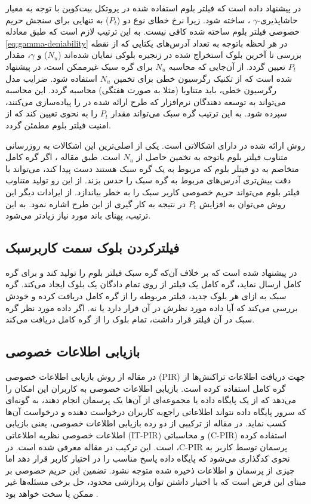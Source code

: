 در \cite{Kanemura2017} پیشنهاد داده است که فیلتر بلوم استفاده شده در پروتکل بیت‌کوین با توجه به معیار حاشاپذیری-$\gamma$  
\cite{Bianchi2012}،
ساخته شود. زیرا نرخ خطای نوع دو ($P_t$) به تنهایی برای سنجش حریم خصوصی فیلتر بلوم ساخته شده کافی نیست. به این ترتیب لازم است که طبق معادله \eqref{eq:gamma-deniability} در هر لحظه باتوجه به تعداد آدرس‌های یکتایی که از نقطه بررسی تا آخرین بلوک استخراج شده در زنجیره بلوکی نمایان شده‌اند ($N_u$) و $\gamma$، مقدار $P_t$ تعیین گردد. از آن‌جایی که محاسبه $N_u$ برای گره سبک غیرممکن است، در \cite{Kanemura2017} پیشنهاد شده است که از تکنیک رگرسیون خطی برای تخمین  $N_u$  استفاده شود. ضرایب مدل رگرسیون خطی، باید متناوبا (مثلا به صورت هفتگی) محاسبه گردد. این محاسبه می‌تواند به توسعه دهندگان نرم‌افزار که طرح ارائه شده در \cite{Kanemura2017}  را پیاده‌سازی می‌کنند، سپرده شود. به این ترتیب گره سبک می‌تواند مقدار $P_t$ را به نحوی تعیین کند که از امنیت فیلتر بلوم مطمئن گردد.

روش ارائه شده در \cite{Kanemura2017} دارای اشکالاتی است. یکی از اصلی‌ترین این اشکالات به روزرسانی متناوب فیلتر بلوم باتوجه به تخمین حاصل از $N_u$  است. طبق مقاله \cite{Gervais2014}، اگر گره کامل متخاصم به دو فیتلر بلوم که مربوط به یک گره سبک هستند دست پیدا کند، می‌تواند با دقت بیش‌تری آدرس‌های مربوط به گره سبک را حدس بزند. از این رو تولید متناوب فیلتر بلوم می‌تواند حریم خصوصی کاربر سبک را به خطر بیاندازد.
از ایرادات دیگر این روش می‌توان به افزایش $P_t$ در نتیجه به کار گیری از این طرح اشاره نمود. به این ترتیب، پهنای باند مورد نیاز زیادتر می‌شود. 

\subsection{فیلترکردن بلوک سمت کاربرسبک}
\label{BIP157}
در \cite{Osuntokun2017} پیشنهاد شده است که بر خلاف آن‌که گره سبک فیلتر بلوم را تولید کند و برای گره کامل ارسال نماید، گره کامل یک فیلتر از روی تمام دادگان یک بلوک ایجاد می‌کند. گره سبک به ازای هر بلوک جدید، فیلتر مربوطه را از گره کامل دریافت کرده و خودش بررسی می‌کند که آیا داده مورد نظرش در آن قرار دارد یا نه. اگر داده مورد نظر گره سبک در آن فیلتر قرار داشت، تمام بلوک را از گره کامل دریافت می‌کند.

\subsection{بازیابی اطلاعات خصوصی}
\label{PIR}
در مقاله \cite{Qin2019} از روش بازیابی اطلاعات خصوصی (PIR) جهت دریافت اطلاعات تراکنش‌ها از گره‌ کامل استفاده کرده است. بازیابی اطلاعات خصوصی به کاربران این امکان را می‌دهد که از یک پایگاه داده یا مجموعه‌ای از آن‌ها یک پرسمان انجام دهند، به گونه‌ای که سرور پایگاه داده نتواند اطلاعاتی راجع‌به کاربران درخواست دهنده و درخواست آن‌ها کسب نماید. در مقاله \cite{Qin2019}  از ترکیبی از دو رده بازیابی اطلاعات خصوصی، یعنی بازیابی اطلاعات خصوصی نظریه اطلاعاتی (IT-PIR) و محاسباتی (C-PIR) استفاده کرده است. این ترکیب در مقاله \cite{Devet2014} معرفی شده است. در ،C-PIR پرسمان توسط کاربر به نحوی کدگذاری می‌شود که پایگاه داده پاسخ مناسب را در اختیار کاربر قرار دهد اما چیزی از پرسمان و اطلاعات ذخیره شده متوجه نشود. تضمین این حریم خصوصی بر مبنای این فرض است که با اختیار داشتن توان پردازشی محدود، حل برخی مسئله‌ها  غیر ممکن یا سخت خواهد بود \cite{Devet2014}.

